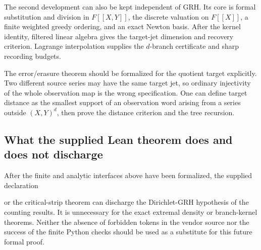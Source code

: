 The second development can also be kept independent of GRH. Its core is
formal substitution and division in $F[[X,Y]]$, the discrete valuation on
$F[[X]]$, a finite weighted greedy ordering, and an exact Newton basis.
After the kernel identity, filtered linear algebra gives the target-jet
dimension and recovery criterion. Lagrange interpolation supplies the
$d$-branch certificate and sharp recording budgets.

The error/erasure theorem should be formalized for the quotient target
explicitly. Two different source series may have the same target jet,
so ordinary injectivity of the whole observation map is the wrong
specification. One can define target distance as the smallest support of
an observation word arising from a series outside $(X,Y)^d$, then prove
the distance criterion and the tree recursion.

\subsection{What the supplied Lean theorem does and does not discharge}

After the finite and analytic interfaces above have been formalized,
the supplied declaration
\begin{center}
\end{center}
or the critical-strip theorem can discharge the Dirichlet-GRH hypothesis of
the counting results. It is unnecessary for the exact extremal density
or branch-kernel theorems. Neither the absence of forbidden tokens in
the vendor source nor the success of the finite Python checks should be
used as a substitute for this future formal proof.
